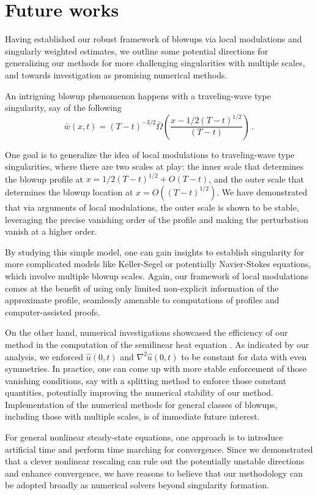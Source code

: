 \documentclass[12pt]{caltech_thesis}
\numberwithin{equation}{section}
\begin{document}
\section{Future works}
\label{subsec:future works}
Having established our robust framework of blowups via local modulations and singularly weighted estimates, we outline some potential directions for generalizing our methods for more challenging singularities with multiple scales, and towards investigation as promising numerical methods.

An intriguing blowup phenomenon happens with a traveling-wave type singularity, say of the following $$\bar{w}(x,t)=(T-t)^{-3/2}\bar{\Omega}(\frac{x-1/2(T-t)^{1/2}}{(T-t)})\,.$$

One goal is to generalize the idea of local modulations to traveling-wave type singularities, where there are two scales at play: the inner scale that determines the blowup profile at $x=1/2(T-t)^{1/2}+O(T-t)$, and the outer scale that determines the blowup location at $x=O((T-t)^{1/2})$. We have demonstrated that via arguments of local modulations, the outer scale is shown to be stable, leveraging the precise vanishing order of the profile and making the perturbation vanish at a higher order. 

By studying this simple model, one can gain insights to establish singularity for more complicated models like Keller-Segel or potentially Navier-Stokes equations, which involve multiple blowup scales. Again, our framework of local modulations comes at the benefit of using only limited non-explicit information of the approximate profile, seamlessly amenable to computations of profiles and computer-assisted proofs.


On the other hand, numerical investigations showcased the efficiency of our method in the computation of the semilinear heat equation \cite{hou20242}. As indicated by our analysis, we enforced $\hat{u}(0,t)$ and $\nabla^2\hat{u}(0,t)$ to be constant for data with even symmetries. In practice, one can come up with more stable enforcement of those vanishing conditions, say with a splitting method to enforce those constant quantities, potentially improving the numerical stability of our method. Implementation of the numerical methods for general classes of blowups, including those with multiple scales, is of immediate future interest.

For general nonlinear steady-state equations, one approach is to introduce artificial time and perform time marching for convergence. Since we demonstrated that a clever nonlinear rescaling can rule out the potentially unstable directions and enhance convergence, we have reasons to believe that our methodology can be adopted broadly as numerical solvers beyond singularity formation.
\end{document}

